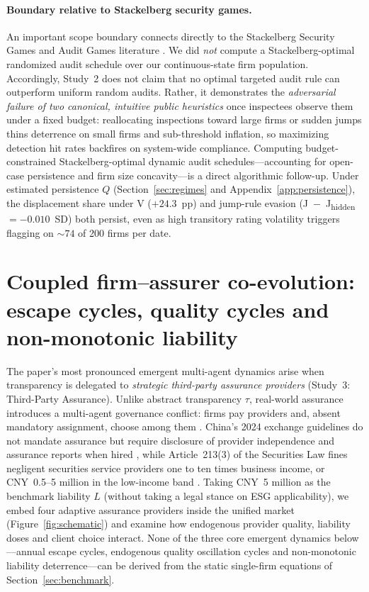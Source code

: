 \documentclass[11pt]{article}
\newcommand{\Jh}{J\textsubscript{hidden}}
\newcounter{algo}
\begin{document}
\paragraph{Boundary relative to Stackelberg security games.}
An important scope boundary connects directly to the Stackelberg Security Games and Audit Games literature \citep{conitzer2006computing,kiekintveld2009computing,tambe2011security,blocki2015audit,sinha2018stackelberg}. We did \emph{not} compute a Stackelberg-optimal randomized audit schedule over our continuous-state firm population. Accordingly, Study~2 does not claim that no optimal targeted audit rule can outperform uniform random audits. Rather, it demonstrates the \emph{adversarial failure of two canonical, intuitive public heuristics} once inspectees observe them under a fixed budget: reallocating inspections toward large firms or sudden jumps thins deterrence on small firms and sub-threshold inflation, so maximizing detection hit rates backfires on system-wide compliance. Computing budget-constrained Stackelberg-optimal dynamic audit schedules---accounting for open-case persistence and firm size concavity---is a direct algorithmic follow-up. Under estimated persistence $Q$ (Section~\ref{sec:regimes} and Appendix~\ref{app:persistence}), the displacement share under V ($+24.3$~pp) and jump-rule evasion (J~$-$~\Jh{} $= -0.010$~SD) both persist, even as high transitory rating volatility triggers flagging on $\sim 74$ of 200 firms per date.

\section{Coupled firm--assurer co-evolution: escape cycles, quality cycles and non-monotonic liability}\label{sec:assurance}

The paper's most pronounced emergent multi-agent dynamics arise when transparency is delegated to \emph{strategic third-party assurance providers} (Study~3: Third-Party Assurance). Unlike abstract transparency $\tau$, real-world assurance introduces a multi-agent governance conflict: firms pay providers and, absent mandatory assignment, choose among them \citep{duflo2013truth,skreta2009ratings,bolton2012credit}. China's 2024 exchange guidelines do not mandate assurance but require disclosure of provider independence and assurance reports when hired \citep[Art.~58]{sse2024guideline}, while Article~213(3) of the Securities Law fines negligent securities service providers one to ten times business income, or CNY~0.5--5 million in the low-income band \citep[Art.~213(3)]{securitieslaw2019}. Taking CNY~5 million as the benchmark liability $L$ (without taking a legal stance on ESG applicability), we embed four adaptive assurance providers inside the unified market (Figure~\ref{fig:schematic}) and examine how endogenous provider quality, liability doses and client choice interact. None of the three core emergent dynamics below---annual escape cycles, endogenous quality oscillation cycles and non-monotonic liability deterrence---can be derived from the static single-firm equations of Section~\ref{sec:benchmark}.
\end{document}
